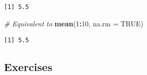 \documentclass[]{book}
\newenvironment{Shaded}{\begin{snugshade}}{\end{snugshade}}
\newcommand{\CommentTok}[1]{\textcolor[rgb]{0.56,0.35,0.01}{\textit{#1}}}
\newcommand{\DataTypeTok}[1]{\textcolor[rgb]{0.13,0.29,0.53}{#1}}
\newcommand{\DecValTok}[1]{\textcolor[rgb]{0.00,0.00,0.81}{#1}}
\newcommand{\KeywordTok}[1]{\textcolor[rgb]{0.13,0.29,0.53}{\textbf{#1}}}
\newcommand{\NormalTok}[1]{#1}
\newcommand{\OperatorTok}[1]{\textcolor[rgb]{0.81,0.36,0.00}{\textbf{#1}}}
\newcommand{\OtherTok}[1]{\textcolor[rgb]{0.56,0.35,0.01}{#1}}
\theoremstyle{definition}
\theoremstyle{definition}
\theoremstyle{definition}
\theoremstyle{remark}
\begin{document}
\begin{verbatim}
[1] 5.5
\end{verbatim}

\begin{Shaded}
\begin{Highlighting}[]
\CommentTok{# Equivalent to}
\KeywordTok{mean}\NormalTok{(}\DecValTok{1}\OperatorTok{:}\DecValTok{10}\NormalTok{, }\DataTypeTok{na.rm =} \OtherTok{TRUE}\NormalTok{)}
\end{Highlighting}
\end{Shaded}

\begin{verbatim}
[1] 5.5
\end{verbatim}

\hypertarget{exercises-5}{%
\subsection{Exercises}\label{exercises-5}}
\end{document}
